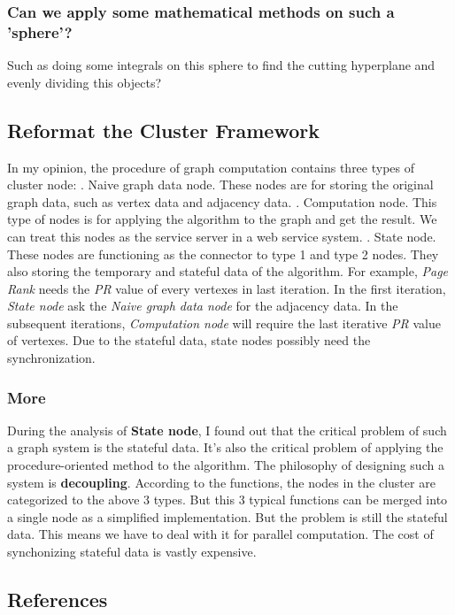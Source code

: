 \documentclass{article}
\begin{document}
	\subsubsection{Can we apply some mathematical methods on such a 'sphere'?}
	Such as doing some integrals on this sphere to find the cutting hyperplane and evenly dividing this objects?

	\subsection{Reformat the Cluster Framework}
	In my opinion, the procedure of graph computation contains three types of cluster node:
	. Naive graph data node. These nodes are for storing the original graph data, such as vertex data and adjacency data.
	. Computation node. This type of nodes is for applying the algorithm to the graph and get the result. We can treat this nodes as the service server in a web service system.
	. State node. These nodes are functioning as the connector to type 1 and type 2 nodes. They also storing the temporary and stateful data of the algorithm. For example, \emph{Page Rank} needs the \emph{PR} value of every vertexes in last iteration. In the first iteration, \emph{State node} ask the \emph{Naive graph data node} for the adjacency data. In the subsequent iterations, \emph{Computation node} will require the last iterative \emph{PR} value of vertexes. Due to the stateful data, state nodes possibly need the synchronization.
	\newline
	\subsubsection{More}
	During the analysis of \textbf{State node}, I found out that the critical problem of such a graph system is the stateful data. It's also the critical problem of applying the procedure-oriented method to the algorithm. The philosophy of designing such a system is \textbf{decoupling}. According to the functions, the nodes in the cluster are categorized to the above 3 types. But this 3 typical functions can be merged into a single node as a simplified implementation.
	\newline
	But the problem is still the stateful data. This means we have to deal with it for parallel computation. The cost of synchonizing stateful data is vastly expensive.

	\newpage
	\begin{appendix}
		\section{References}
		
		
	\end{appendix}
\end{document}
